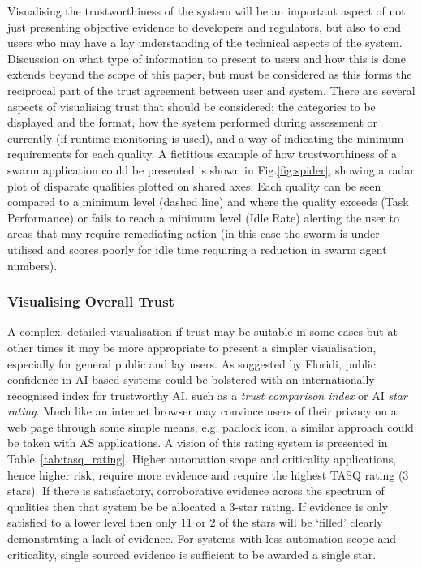 Visualising the trustworthiness of the system will be an important aspect of not just presenting objective evidence to developers and regulators, but also to end users who may have a lay understanding of the technical aspects of the system. 
%
Discussion on what type of information to present to users and how this is done extends beyond the scope of this paper, but must be considered as this forms the reciprocal part of the trust agreement between user and system. 
%
There are several aspects of visualising trust that should be considered; the categories to be displayed and the format, how the system performed during assessment or currently (if runtime monitoring is used), and a way of indicating the minimum requirements for each quality.
%
A fictitious example of how trustworthiness of a swarm application could be presented is shown in Fig.\ref{fig:spider}, showing a radar plot of disparate qualities plotted on shared axes. Each quality can be seen compared to a minimum level (dashed line) and where the quality exceeds (Task Performance) or fails to reach a minimum level (Idle Rate) alerting the user to areas that may require remediating action (in this case the swarm is under-utilised and scores poorly for idle time requiring a reduction in swarm agent numbers). 

\subsubsection{Visualising Overall Trust}

A complex, detailed visualisation if trust may be suitable in some cases but at other times it may be more appropriate to present a simpler visualisation, especially for general public and lay users. 
%
As suggested by Floridi, public confidence in AI-based systems could be bolstered with an internationally recognised index for trustworthy AI, such as a \emph{trust comparison index} or AI \emph{star rating}. Much like an internet browser may convince users of their privacy on a web page through some simple means, e.g. padlock icon, a similar approach could be taken with AS applications. 
%
A vision of this rating system is presented in Table~\ref{tab:tasq_rating}. Higher automation scope and criticality applications, hence higher risk, require more evidence and require the highest TASQ rating (3 stars). If there is satisfactory, corroborative evidence across the spectrum of qualities then that system be be allocated a 3-star rating. 
%
If evidence is only satisfied to a lower level then only 11 or 2 of the stars will be `filled' clearly demonstrating a lack of evidence. 
%
For systems with less automation scope and criticality, single sourced evidence is sufficient to be awarded a single star.



